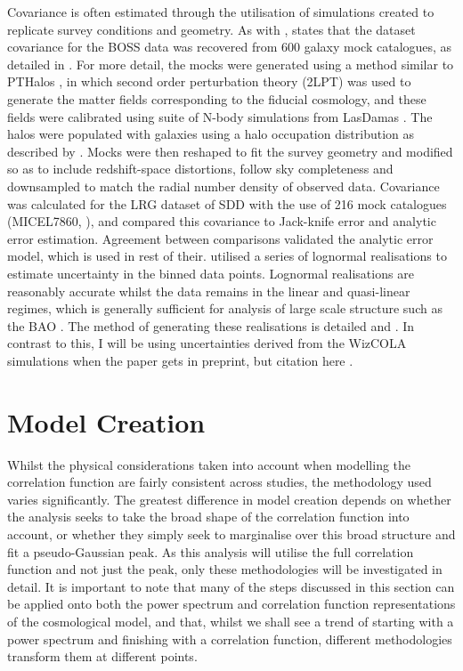 \documentclass[titlesmallcaps, examinerscopy, copyrightpage]{uqthesis}
\newcommand{\red}{\color{red}}
\begin{document}
Covariance is often estimated through the utilisation of simulations created to replicate survey conditions and geometry. As with \citet{SanchezScoccola2012}, \citet{AndersonAubourg2012} states that the dataset covariance for the BOSS data was recovered from 600 galaxy mock catalogues, as detailed in \citet{ManeraScoccimarro2013}. For more detail, the mocks were generated using a method similar to PTHalos \citep{ScoccimarroSheth2002}, in which second order perturbation theory (2LPT) was used to generate the matter fields corresponding to the fiducial cosmology, and these fields were calibrated using suite of N-body simulations from LasDamas \citep{McBride2011}. The halos were populated with galaxies using a halo occupation distribution as described by \citet{ZhengCoilZehavi2007}. Mocks were then reshaped to fit the survey geometry and modified so as to include redshift-space distortions, follow sky completeness and downsampled to match the radial number density of observed data. Covariance was calculated for the LRG dataset of SDD with the use of 216 mock catalogues (MICEL7860, \citet[see][for details]{FosalbaGaztanaga2008, CrocceFosalbaCastander2010}), and \citet{Gaztanaga2009} compared this covariance to Jack-knife error and analytic error estimation. Agreement between comparisons validated the analytic error model, which is used in rest of their. \citet{BlakeDavis2011} utilised a series of lognormal realisations to estimate uncertainty in the binned data points. Lognormal realisations are reasonably accurate whilst the data remains in the linear and quasi-linear regimes, which is generally sufficient for analysis of large scale structure such as the BAO \citep{ColesJones1991}. The method of generating these realisations is detailed \citet{BlakeGlazebrook2003} and \citet{GlazebrookBlake2005}. In contrast to this, I will be using uncertainties derived from the WizCOLA simulations {\red when the paper gets in preprint, but citation here }. 






\section{Model Creation}

Whilst the physical considerations taken into account when modelling the correlation function are fairly consistent across studies, the methodology used varies significantly. The greatest difference in model creation depends on whether the analysis seeks to take the broad shape of the correlation function into account, or whether they simply seek to marginalise over this broad structure and fit a pseudo-Gaussian peak. As this analysis will utilise the full correlation function and not just the peak, only these methodologies will be investigated in detail. It is important to note that many of the steps discussed in this section can be applied onto both the power spectrum and correlation function representations of the cosmological model, and that, whilst we shall see a trend of starting with a power spectrum and finishing with a correlation function, different methodologies transform them at different points. 
\end{document}
